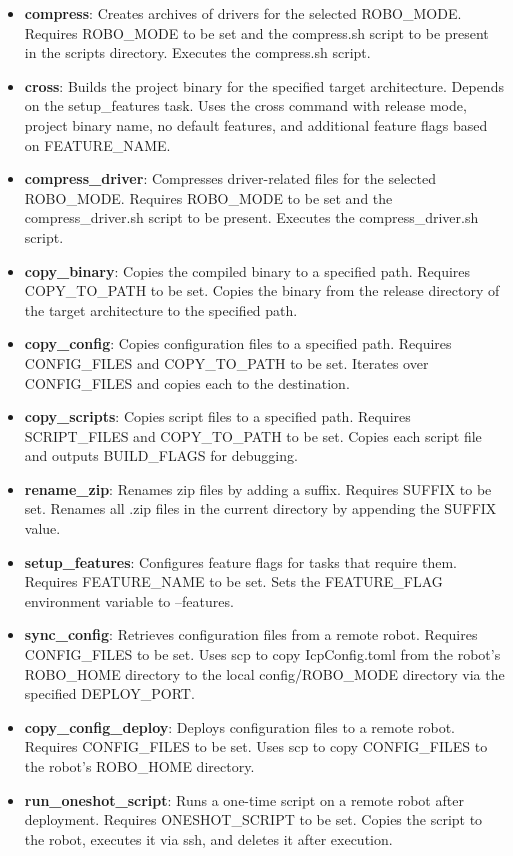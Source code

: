 \begin{itemize}
    \item \textbf{compress}: Creates archives of drivers for the selected ROBO\_MODE. Requires ROBO\_MODE to be set and the compress.sh script to be present in the scripts directory. Executes the compress.sh script.
    \item \textbf{cross}: Builds the project binary for the specified target architecture. Depends on the setup\_features task. Uses the cross command with release mode, project binary name, no default features, and additional feature flags based on FEATURE\_NAME.
    \item \textbf{compress\_driver}: Compresses driver-related files for the selected ROBO\_MODE. Requires ROBO\_MODE to be set and the compress\_driver.sh script to be present. Executes the compress\_driver.sh script.
    \item \textbf{copy\_binary}: Copies the compiled binary to a specified path. Requires COPY\_TO\_PATH to be set. Copies the binary from the release directory of the target architecture to the specified path.
    \item \textbf{copy\_config}: Copies configuration files to a specified path. Requires CONFIG\_FILES and COPY\_TO\_PATH to be set. Iterates over CONFIG\_FILES and copies each to the destination.
    \item \textbf{copy\_scripts}: Copies script files to a specified path. Requires SCRIPT\_FILES and COPY\_TO\_PATH to be set. Copies each script file and outputs BUILD\_FLAGS for debugging.
    \item \textbf{rename\_zip}: Renames zip files by adding a suffix. Requires SUFFIX to be set. Renames all .zip files in the current directory by appending the SUFFIX value.
    \item \textbf{setup\_features}: Configures feature flags for tasks that require them. Requires FEATURE\_NAME to be set. Sets the FEATURE\_FLAG environment variable to --features.
    \item \textbf{sync\_config}: Retrieves configuration files from a remote robot. Requires CONFIG\_FILES to be set. Uses scp to copy IcpConfig.toml from the robot’s ROBO\_HOME directory to the local config/ROBO\_MODE directory via the specified DEPLOY\_PORT.
    \item \textbf{copy\_config\_deploy}: Deploys configuration files to a remote robot. Requires CONFIG\_FILES to be set. Uses scp to copy CONFIG\_FILES to the robot’s ROBO\_HOME directory.
    \item \textbf{run\_oneshot\_script}: Runs a one-time script on a remote robot after deployment. Requires ONESHOT\_SCRIPT to be set. Copies the script to the robot, executes it via ssh, and deletes it after execution.

\end{itemize}

